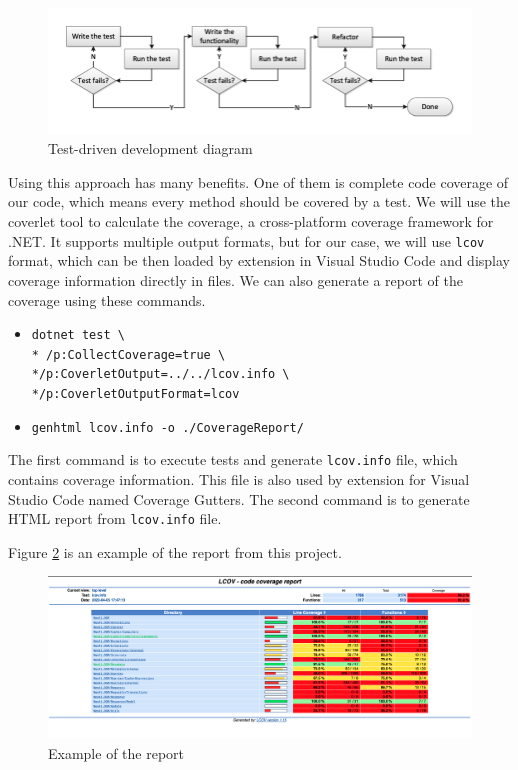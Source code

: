 \begin{figure}[H]
	\centering
	\includegraphics[width=\textwidth]{content/Test-Driven-Development-activities.png}
	\caption{Test-driven development diagram \cite{madeyski_continuous_2013}}
	\label{fig:tddDiagram}
\end{figure}

Using this approach has many benefits. One of them is complete code coverage of our code, which means every method should be covered by a test.
We will use the coverlet tool to calculate the coverage, a cross-platform coverage framework for .NET. \cite{noauthor_coverlet_2022}
It supports multiple output formats, but for our case, we will use \texttt{lcov} format, which can be then loaded by extension in Visual Studio Code and display coverage information directly in files.
We can also generate a report of the coverage using these commands.
\begin{itemize}
	\item {\texttt{dotnet test \textbackslash\\*
		      /p:CollectCoverage=true \textbackslash\\*/p:CoverletOutput=../../lcov.info \textbackslash\\*/p:CoverletOutputFormat=lcov}}
	\item {\texttt{genhtml lcov.info -o ./CoverageReport/}}
\end{itemize}
The first command is to execute tests and generate \texttt{lcov.info} file, which contains coverage information. This file is also used by extension for Visual Studio Code
named Coverage Gutters.
The second command is to generate HTML report from \texttt{lcov.info} file.

Figure \ref{fig:report} is an example of the report from this project.

\begin{figure}[H]
	\centering
	\includegraphics[width=\textwidth]{content/coverage_report.png}
	\caption{Example of the report}
	\label{fig:report}
\end{figure}

